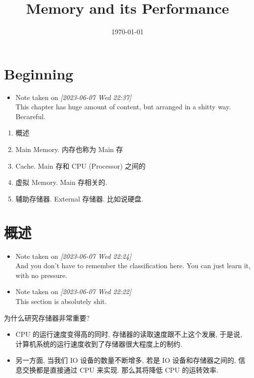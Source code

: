 \documentclass[11pt]{article}
\date{\today}
\title{Memory and its Performance}
\begin{document}
\maketitle
\tableofcontents

\section{Beginning}
\label{sec:org3525e2a}
\begin{itemize}
\item Note taken on \textit{[2023-06-07 Wed 22:37] } \\
This chapter has huge amount of content, but arranged in a shitty way. Becareful.
\end{itemize}
\begin{enumerate}
\item 概述
\item Main Memory. 内存也称为 Main 存
\item Cache. Main 存和 CPU (Processor) 之间的
\item 虚拟 Memory. Main 存相关的.
\item 辅助存储器. External 存储器. 比如说硬盘.
\end{enumerate}

\section{概述}
\label{sec:org5191d1e}
\begin{itemize}
\item Note taken on \textit{[2023-06-07 Wed 22:24] } \\
And you don't have to remember the classification here. You can just learn it, with no pressure.
\item Note taken on \textit{[2023-06-07 Wed 22:22] } \\
This section is absolutely shit.
\end{itemize}

为什么研究存储器非常重要?

\begin{itemize}
\item CPU 的运行速度变得高的同时, 存储器的读取速度跟不上这个发展, 于是说, 计算机系统的运行速度收到了存储器很大程度上的制约.
\item 另一方面, 当我们 IO 设备的数量不断增多, 若是 IO 设备和存储器之间的, 信息交换都是直接通过 CPU 来实现. 那么其将降低 CPU 的运转效率.
\end{itemize}
\end{document}
